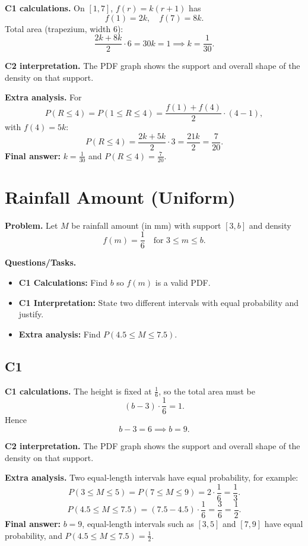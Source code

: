 \textbf{C1 calculations.}
On $[1,7]$, $f(r)=k(r+1)$ has
	\[
	f(1)=2k,\quad f(7)=8k.
	\]
	Total area (trapezium, width $6$):
	\[
	\frac{2k+8k}{2}\cdot6=30k=1\implies k=\frac1{30}.
	\]

\textbf{C2 interpretation.}
The PDF graph shows the support and overall shape of the density on that support.

\textbf{Extra analysis.}
For
\[
P(R\le4)=P(1\le R\le4)=\frac{f(1)+f(4)}{2}\cdot(4-1),
\]
with $f(4)=5k$:
\[
P(R\le4)=\frac{2k+5k}{2}\cdot3=\frac{21k}{2}=\frac7{20}.
\]
\textbf{Final answer:} $k=\frac1{30}$ and $P(R\le4)=\frac7{20}$.
	
	\section{Rainfall Amount (Uniform)}
	
	\textbf{Problem.}
	Let $M$ be rainfall amount (in mm) with support $[3,b]$ and density
	\[
	f(m)=\frac16\quad\text{for }3\le m\le b.
	\]
	
	\textbf{Questions/Tasks.}
	\begin{itemize}
		\item \textbf{C1 Calculations:} Find $b$ so $f(m)$ is a valid PDF.
		\item \textbf{C1 Interpretation:} State two different intervals with equal probability and justify.
		\item \textbf{Extra analysis:} Find $P(4.5\le M\le 7.5)$.
	\end{itemize}
	
	\subsection*{C1}
	
	\textbf{C1 calculations.}
	The height is fixed at $\frac16$, so the total area must be
	\[
	(b-3)\cdot \frac16=1.
	\]
	Hence
	\[
	b-3=6\implies b=9.
	\]
	
	\textbf{C2 interpretation.}
	The PDF graph shows the support and overall shape of the density on that support.
	
	\textbf{Extra analysis.}
	Two equal-length intervals have equal probability, for example:
	\[
	P(3\le M\le5)=P(7\le M\le9)=2\cdot\frac16=\frac13.
	\]
	\[
	P(4.5\le M\le7.5)=(7.5-4.5)\cdot\frac16=\frac{3}{6}=\frac12.
	\]
	\textbf{Final answer:} $b=9$, equal-length intervals such as $[3,5]$ and $[7,9]$ have equal probability, and $P(4.5\le M\le7.5)=\frac12$.
	
